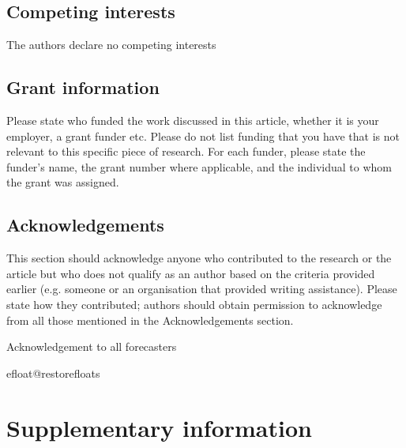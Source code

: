 \documentclass[10pt,a4paper,twocolumn]{article}
\begin{document}
\subsection*{Competing interests}
The authors declare no competing interests

\subsection*{Grant information}
Please state who funded the work discussed in this article, whether it is your employer,
a grant funder etc. Please do not list funding that you have that is not relevant to this
specific piece of research. For each funder, please state the funder’s name, the grant
number where applicable, and the individual to whom the grant was assigned.

\subsection*{Acknowledgements}
This section should acknowledge anyone who contributed to the research or the
article but who does not qualify as an author based on the criteria provided earlier
(e.g. someone or an organisation that provided writing assistance). Please state how
they contributed; authors should obtain permission to acknowledge from all those
mentioned in the Acknowledgements section.

Acknowledgement to all forecasters








\clearpage

{\small
}

\bigskip
\clearpage


\processdelayedfloats
\csname efloat@restorefloats\endcsname

\appendix
\section*{Supplementary information}
\renewcommand{\thefigure}{SI.\arabic{figure}}
\setcounter{figure}{0}
\renewcommand{\thetable}{SI.\arabic{table}} \setcounter{table}{0}
\end{document}
